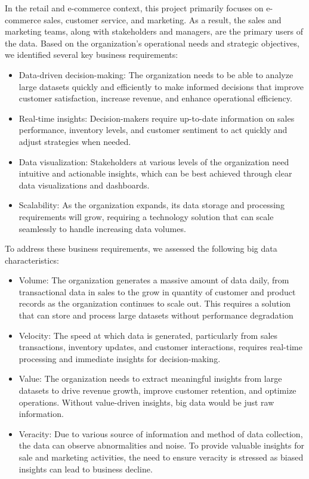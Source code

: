 In the retail and e-commerce context, this project primarily focuses on e-commerce sales, customer service, and marketing. 
As a result, the sales and marketing teams, along with stakeholders and managers, are the primary users of the data.
Based on the organization’s operational needs and strategic objectives, we identified several key business
requirements:
\begin{itemize}
    \item 
Data-driven decision-making: The organization needs to be able to analyze large datasets quickly and efficiently to make 
informed decisions that improve customer satisfaction, increase revenue, and enhance operational efficiency.
\item Real-time insights: Decision-makers require up-to-date information on sales performance, inventory levels, and customer
sentiment to act quickly and adjust strategies when needed.
\item Data visualization: Stakeholders at various levels of the organization need intuitive and actionable insights, which 
can be best achieved through clear data visualizations and dashboards.
\item Scalability: As the organization expands, its data storage and processing requirements will grow, requiring a technology
solution that can scale seamlessly to handle increasing data volumes.
\end{itemize}
To address these business requirements, we assessed the following big data characteristics:
\begin{itemize}
\item Volume: The organization generates a massive amount of data daily, from transactional data in sales to the grow in quantity
of customer and product records as the organization continues to scale out. This requires a solution that can store and process
large datasets without performance degradation
\item Velocity: The speed at which data is generated, particularly from sales transactions, inventory updates, and customer
 interactions, requires real-time processing and immediate insights for decision-making.
\item Value: The organization needs to extract meaningful insights from large datasets to drive revenue growth, improve
customer retention, and optimize operations. Without value-driven insights, big data would be just raw information.
\item Veracity: Due to various source of information and method of data collection, the data can observe abnormalities and
noise. To provide valuable insights for sale and marketing activities, the need to ensure veracity is stressed as biased 
insights can lead to business decline.
\end{itemize}
\newpage
